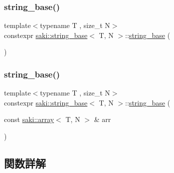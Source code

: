 \subsubsection{\texorpdfstring{string\+\_\+base()}{string\_base()}\hspace{0.1cm}{\footnotesize\ttfamily [1/2]}}
{\footnotesize\ttfamily template$<$typename T , size\+\_\+t N$>$ \\
constexpr \mbox{\hyperlink{classsaki_1_1string__base}{saki\+::string\+\_\+base}}$<$ T, N $>$\+::\mbox{\hyperlink{classsaki_1_1string__base}{string\+\_\+base}} (\begin{DoxyParamCaption}{ }\end{DoxyParamCaption})\hspace{0.3cm}{\ttfamily [inline]}}

\mbox{\label{classsaki_1_1string__base_a72a95e9a65c0e1e4bcbd47fca9c78281}} 
\subsubsection{\texorpdfstring{string\+\_\+base()}{string\_base()}\hspace{0.1cm}{\footnotesize\ttfamily [2/2]}}
{\footnotesize\ttfamily template$<$typename T , size\+\_\+t N$>$ \\
constexpr \mbox{\hyperlink{classsaki_1_1string__base}{saki\+::string\+\_\+base}}$<$ T, N $>$\+::\mbox{\hyperlink{classsaki_1_1string__base}{string\+\_\+base}} (\begin{DoxyParamCaption}\item[{const \mbox{\hyperlink{classsaki_1_1array}{saki\+::array}}$<$ T, N $>$ \&}]{arr }\end{DoxyParamCaption})\hspace{0.3cm}{\ttfamily [inline]}}



\subsection{関数詳解}
\mbox{\label{classsaki_1_1string__base_aca7367871a2c8e1722032240f4fa42fa}} 
